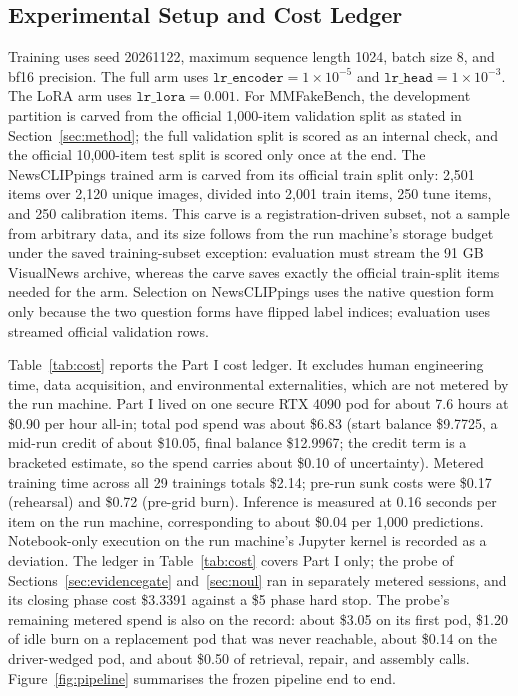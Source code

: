 \documentclass{article} %
\begin{document}
\subsection{Experimental Setup and Cost Ledger}
Training uses seed 20261122, maximum sequence length 1024, batch size 8, and bf16 precision. The full arm uses \( \texttt{lr\_encoder}=1\times10^{-5} \) and \( \texttt{lr\_head}=1\times10^{-3} \). The LoRA arm uses \( \texttt{lr\_lora}=0.001 \). For MMFakeBench, the development partition is carved from the official 1,000-item validation split as stated in Section~\ref{sec:method}; the full validation split is scored as an internal check, and the official 10,000-item test split is scored only once at the end. The NewsCLIPpings trained arm is carved from its official train split only: 2,501 items over 2,120 unique images, divided into 2,001 train items, 250 tune items, and 250 calibration items. This carve is a registration-driven subset, not a sample from arbitrary data, and its size follows from the run machine's storage budget under the saved training-subset exception: evaluation must stream the 91 GB VisualNews archive, whereas the carve saves exactly the official train-split items needed for the arm. Selection on NewsCLIPpings uses the native question form only because the two question forms have flipped label indices; evaluation uses streamed official validation rows.

Table~\ref{tab:cost} reports the Part I cost ledger. It excludes human engineering time, data acquisition, and environmental externalities, which are not metered by the run machine. Part I lived on one secure RTX 4090 pod for about 7.6 hours at \$0.90 per hour all-in; total pod spend was about \$6.83 (start balance \$9.7725, a mid-run credit of about \$10.05, final balance \$12.9967; the credit term is a bracketed estimate, so the spend carries about \$0.10 of uncertainty). Metered training time across all 29 trainings totals \$2.14; pre-run sunk costs were \$0.17 (rehearsal) and \$0.72 (pre-grid burn). Inference is measured at 0.16 seconds per item on the run machine, corresponding to about \$0.04 per 1,000 predictions. Notebook-only execution on the run machine's Jupyter kernel is recorded as a deviation. The ledger in Table~\ref{tab:cost} covers Part I only; the probe of Sections~\ref{sec:evidencegate} and~\ref{sec:noul} ran in separately metered sessions, and its closing phase cost \$3.3391 against a \$5 phase hard stop. The probe's remaining metered spend is also on the record: about \$3.05 on its first pod, \$1.20 of idle burn on a replacement pod that was never reachable, about \$0.14 on the driver-wedged pod, and about \$0.50 of retrieval, repair, and assembly calls. Figure~\ref{fig:pipeline} summarises the frozen pipeline end to end.
\end{document}
